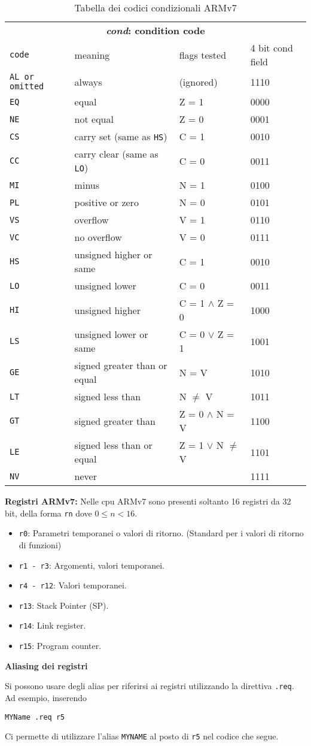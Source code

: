 \def\code#1#2#3#4{\texttt{#1} & \small #2 & #3 & #4\\}
\begin{table}[H]
	\centering
	\caption{Tabella dei codici condizionali ARMv7}
	\label{tab:codes}
	\begin{tabular}{l@{\hspace{5mm}}lll}
	\multicolumn{4}{c}{\bfseries \emph{cond}: condition code} \\
	\code{code}{meaning}{flags tested}{4 bit cond field}
	\hline
	\code{AL \textrm{or omitted}}{always}{(ignored)}{1110}
	\code{EQ}{equal}{Z = 1}{0000}
	\code{NE}{not equal}{Z = 0}{0001}
	\code{CS}{carry set (same as \texttt{HS})}{C = 1}{0010}
	\code{CC}{carry clear (same as \texttt{LO})}{C = 0}{0011}
	\code{MI}{minus}{N = 1}{0100}
	\code{PL}{positive or zero}{N = 0}{0101}
	\code{VS}{overflow}{V = 1}{0110}
	\code{VC}{no overflow}{V = 0}{0111}
	\code{HS}{unsigned higher or same}{C = 1}{0010}
	\code{LO}{unsigned lower}{C = 0}{0011}
	\code{HI}{unsigned higher}{C = 1 $\wedge$ Z = 0}{1000}
	\code{LS}{unsigned lower or same}{C = 0 $\vee$ Z = 1}{1001}
	\code{GE}{signed greater than or equal}{N = V}{1010}
	\code{LT}{signed less than}{N $\neq$ V}{1011}
	\code{GT}{signed greater than}{Z = 0 $\wedge$ N = V}{1100}
	\code{LE}{signed less than or equal}{Z = 1 $\vee$ N $\neq$ V}{1101}
	\code{NV}{never}{}{1111}
	\hline
	\end{tabular}
\end{table}

\begin{defn}
\textbf{Registri ARMv7:}
Nelle cpu ARMv7 sono presenti soltanto 16 registri da 32 bit, della forma \texttt{rn} dove $ 0 \leq n < 16 $.

\begin{itemize}
	\item \texttt{r0}: Parametri temporanei o valori di ritorno. (Standard per i valori di ritorno di funzioni)
	\item \texttt{r1 - r3}: Argomenti, valori temporanei.
	\item \texttt{r4 - r12}: Valori temporanei.
	\item \texttt{r13}: Stack Pointer (SP).
	\item \texttt{r14}: Link register.
	\item \texttt{r15}: Program counter.
\end{itemize}
\end{defn}


\begin{defn}
	\textbf{Aliasing dei registri}

	Si possono usare degli alias per riferirsi ai registri utilizzando la direttiva
	\texttt{.req}. Ad esempio, inserendo
\begin{lstlisting}[style=arm]
	MYName .req r5
\end{lstlisting}
	Ci permette di utilizzare l'alias \texttt{MYNAME} al posto di \texttt{r5} nel codice che segue.
\end{defn}

